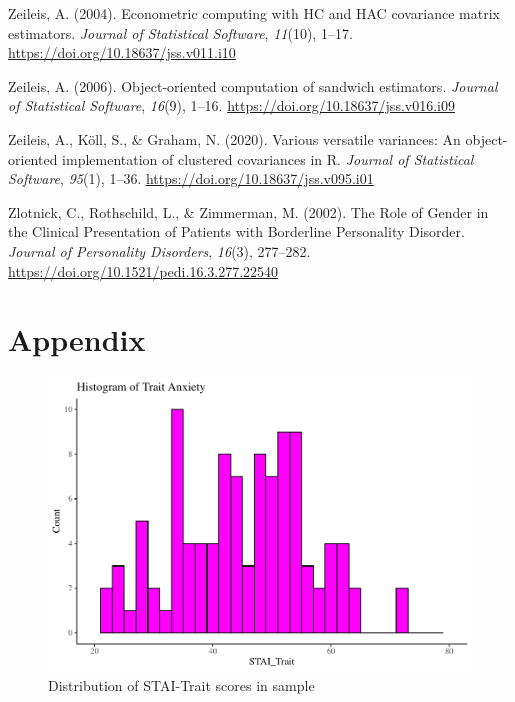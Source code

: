 \documentclass[
  man,floatsintext]{apa7}
\newlength{\cslhangindent}
\newlength{\cslentryspacingunit} %
\newenvironment{CSLReferences}[2] %
 {%
  \setlength{\parindent}{0pt}
  \ifodd #1
  \let\oldpar\par
  \def\par{\hangindent=\cslhangindent\oldpar}
  \fi
  \setlength{\parskip}{#2\cslentryspacingunit}
 }%
 {}
\begin{document}
\begin{CSLReferences}{1}{0}
\leavevmode{}%
Zeileis, A. (2004). Econometric computing with {HC} and {HAC} covariance matrix estimators. \emph{Journal of Statistical Software}, \emph{11}(10), 1--17. \url{https://doi.org/10.18637/jss.v011.i10}

\leavevmode{}%
Zeileis, A. (2006). Object-oriented computation of sandwich estimators. \emph{Journal of Statistical Software}, \emph{16}(9), 1--16. \url{https://doi.org/10.18637/jss.v016.i09}

\leavevmode{}%
Zeileis, A., Köll, S., \& Graham, N. (2020). Various versatile variances: An object-oriented implementation of clustered covariances in {R}. \emph{Journal of Statistical Software}, \emph{95}(1), 1--36. \url{https://doi.org/10.18637/jss.v095.i01}

\leavevmode{}%
Zlotnick, C., Rothschild, L., \& Zimmerman, M. (2002). The {Role} of {Gender} in the {Clinical Presentation} of {Patients} with {Borderline Personality Disorder}. \emph{Journal of Personality Disorders}, \emph{16}(3), 277--282. \url{https://doi.org/10.1521/pedi.16.3.277.22540}

\end{CSLReferences}

\newpage

\hypertarget{appendix}{%
\section{Appendix}\label{appendix}}

\begin{figure}
\includegraphics[width=1\linewidth]{d2m-Psychopathy_files/figure-latex/STAI-descriptives-1} \caption{Distribution of STAI-Trait scores in sample}\label{fig:STAI-descriptives-appendix}
\end{figure}
\end{document}
